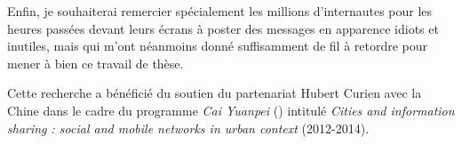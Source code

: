 Enfin, je souhaiterai remercier spécialement les millions d'internautes pour les heures passées devant leurs écrans à poster des messages en apparence idiots et inutiles, mais qui m'ont néanmoins donné suffisamment de fil à retordre pour mener à bien ce travail de thèse.

\bigskip
Cette recherche a bénéficié du soutien du partenariat Hubert Curien avec la Chine dans le cadre du programme \textit{Cai Yuanpei} () intitulé \textit{Cities and information sharing : social and mobile networks in urban context} (2012-2014).